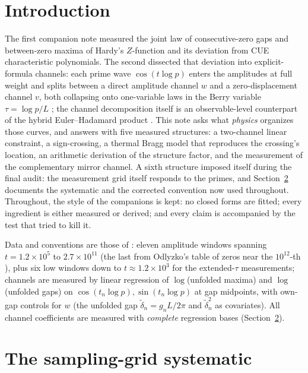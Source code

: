 \documentclass[12pt]{amsart}
\begin{document}
\maketitle

\section{Introduction}

The first companion note \cite{companion1} measured the joint law of
consecutive-zero gaps and between-zero maxima of Hardy's $Z$-function and
its deviation from CUE characteristic polynomials. The second
\cite{companion2} dissected that deviation into explicit-formula
channels: each prime wave $\cos(t \log p)$ enters the amplitudes at full
weight and splits between a direct amplitude channel $w$ and a
zero-displacement channel $v$, both collapsing onto one-variable laws in
the Berry variable $\tau = \log p / L$ \cite{Berry88}; the channel
decomposition itself is an observable-level counterpart of the hybrid
Euler--Hadamard product \cite{GHK07}. This note asks what \emph{physics} organizes those
curves, and answers with five measured structures: a two-channel linear
constraint, a sign-crossing, a thermal Bragg model that reproduces the
crossing's location, an arithmetic derivation of the structure factor,
and the measurement of the complementary mirror channel. A sixth
structure imposed itself during the final audit: the measurement grid
itself responds to the primes, and Section~\ref{sec:grid} documents the
systematic and the corrected convention now used throughout. Throughout, the style
of the companions is kept: no closed forms are fitted; every ingredient
is either measured or derived; and every claim is accompanied by the
test that tried to kill it.

Data and conventions are those of \cite{companion1, companion2}: eleven
amplitude windows spanning $t = 1.2\times10^5$ to $2.7\times10^{11}$
(the last from Odlyzko's table of zeros near the $10^{12}$-th
\cite{OdlyzkoTables}), plus six low windows down to $t \approx 1.2\times
10^3$ for the extended-$\tau$ measurements; channels are measured by
linear regression of $\log$(unfolded maxima) and $\log$(unfolded gaps)
on $\cos(t_n \log p), \sin(t_n \log p)$ at gap midpoints, with own-gap
controls for $w$ (the unfolded gap $\tilde\delta_n = g_n L/2\pi$ and
$\tilde\delta_n^2$ as covariates). All channel coefficients are measured with
\emph{complete} regression bases (Section~\ref{sec:grid}).

\section{The sampling-grid systematic}\label{sec:grid}
\end{document}
